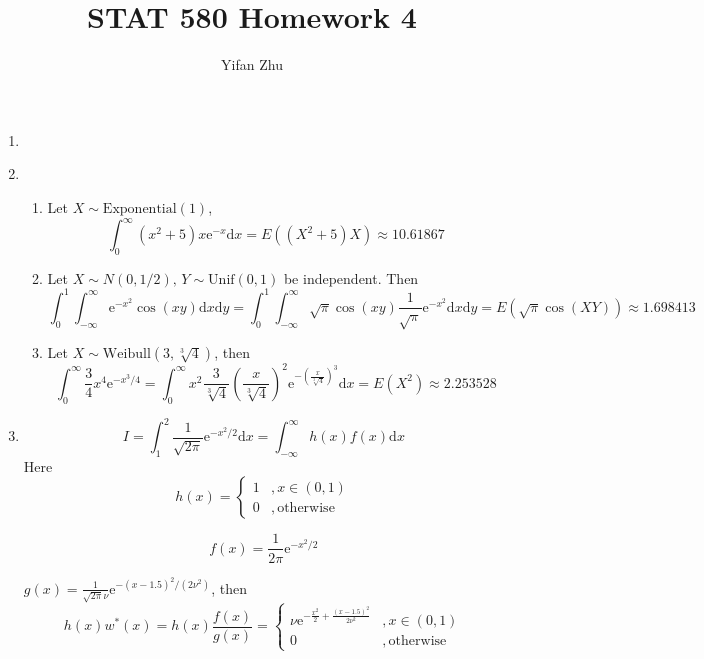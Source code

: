 \documentclass{article}
\begin{document}
	

	
	\title{STAT 580 Homework 4}
	\author{Yifan Zhu}
	\maketitle
	
	\begin{enumerate}[leftmargin = 0 em, label = \arabic*., font = \bfseries]
	\item \ 

	

	\item 
	\begin{enumerate}
		\item 
		Let $X \sim \mathrm{Exponential(1)}$, 
		\[\int_{0}^\infty (x^2 + 5) x \mathrm{e}^{-x}\mathrm{d}x = E\left( (X^2 + 5) X\right) \approx 10.61867\]
		

		\item 
		Let $X \sim N(0,1/2),\, Y \sim \mathrm{Unif}(0,1)$ be independent. Then
		\[\int_{0}^1 \int_{-\infty}^\infty \mathrm{e}^{-x^2} \cos (xy) \mathrm{d}x \mathrm{d}y = \int_0^1 \int_{-\infty}^\infty \sqrt{\pi} \cos (xy) \frac{1}{\sqrt{\pi}} \mathrm{e}^{-x^2} \mathrm{d}x \mathrm{d}y = E\left( \sqrt{\pi} \cos (X Y)\right)\approx 1.698413\]

		

		\item 
		Let $X \sim \mathrm{Weibull}(3, \sqrt[3]{4})$, then
		\[\int_{0}^\infty \frac{3}{4} x^4 \mathrm{e}^{-x^3/4} = \int_{0}^\infty x^2 \frac{3}{\sqrt[3]{4}}\left( \frac{x}{\sqrt[3]{4}}\right)^2 \mathrm{e}^{- \left( \frac{x}{\sqrt[3]{4}}\right)^3} \mathrm{d}x = E(X^2) \approx 2.253528\]

		
	\end{enumerate}
\newpage
	\item 
	\[I = \int_{1}^2 \frac{1}{\sqrt{2 \pi}} \mathrm{e}^{-x^2/2} \mathrm{d}x = \int_{-\infty}^\infty h(x) f(x) \mathrm{d}x\]
	Here
	\[h(x) = \begin{cases}
		1 & , x \in (0,1)\\
		0 & , \mathrm{otherwise}
	\end{cases}\]

	\[f(x) = \frac{1}{2 \pi} \mathrm{e}^{-x^2/2}\]

	$g(x) = \frac{1}{\sqrt{2 \pi} \nu} \mathrm{e}^{-(x - 1.5)^2/(2 \nu^2)}  $, then
	\[h(x)w^*(x) = h(x) \frac{f(x)}{g(x)} = \begin{cases}
		\nu \mathrm{e}^{-\frac{x^2}{2} + \frac{(x - 1.5)^2}{2 \nu^2}} & , x \in (0,1)\\
		0 &, \mathrm{otherwise}
	\end{cases}\]


\end{enumerate}
\end{document}

